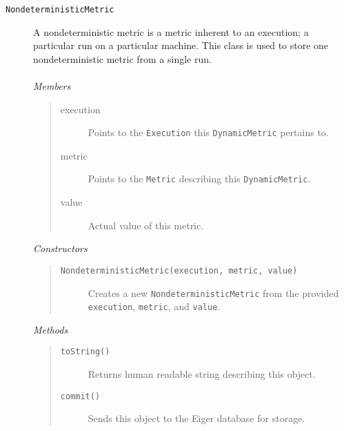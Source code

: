 \begin{description}
\item[\texttt{NondeterministicMetric}] A nondeterministic metric is a metric inherent to an execution; a particular run on a particular machine.
  This class is used to store one nondeterministic metric from a single run.\\ \\
	{\em Members}
	\begin{quote}
	\begin{description}
	\item[execution] Points to the \texttt{Execution} this \texttt{DynamicMetric} pertains to. 
	\item[metric] Points to the \texttt{Metric} describing this \texttt{DynamicMetric}.
	\item[value] Actual value of this metric.
	\end{description}
	\end{quote}
	{\em Constructors}
	\begin{quote}
	\begin{description}
	\item[\texttt{NondeterministicMetric(execution, metric, value)}] Creates a new \texttt{NondeterministicMetric} from the provided \texttt{execution}, \texttt{metric}, and \texttt{value}.
	\end{description}
	\end{quote}
	{\em Methods}
	\begin{quote}
	\begin{description}
	\item[\texttt{toString()}] Returns human readable string describing this object.
	\item[\texttt{commit()}] Sends this object to the Eiger database for storage.
	\end{description}
	\end{quote}


\end{description}
